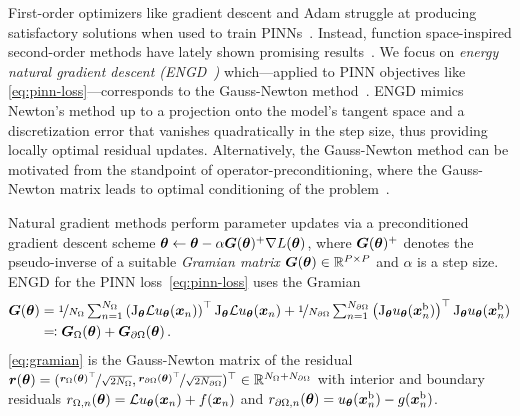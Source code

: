 First-order optimizers like gradient descent and Adam struggle at producing satisfactory solutions when used to train PINNs~\citep{cuomo2022scientific}.
Instead, function space-inspired second-order methods have lately shown promising results~\citep{muller2024optimization}.
We focus on \emph{energy natural gradient descent (ENGD~\cite{muller2023achieving})} which---applied to PINN objectives like \eqref{eq:pinn-loss}---corresponds to the Gauss-Newton method~\cite[][Chapter 6.3]{bottou2016machine}.
ENGD mimics Newton's method up to a projection onto the model's tangent space and a discretization error that vanishes quadratically in the step size, thus providing locally optimal residual updates.
Alternatively, the Gauss-Newton method can be motivated from the standpoint of operator-preconditioning, where the Gauss-Newton matrix leads to optimal conditioning of the problem~\citep{de2023operator}.

Natural gradient methods perform parameter updates via a preconditioned gradient descent scheme ${\bm{\theta}} \leftarrow {\bm{\theta}} - \alpha {\bm{G}}({\bm{\theta}})^+\nabla L({\bm{\theta}})$, where ${\bm{G}}({\bm{\theta}})^+$ denotes the pseudo-inverse of a suitable \emph{Gramian matrix} ${\bm{G}}({\bm{\theta}}) \in {\mathbb{R}}^{P \times P}$ and $\alpha$ is a step size.
ENGD for the PINN loss~\eqref{eq:pinn-loss} uses the Gramian
\begin{align}\label{eq:gramian}
  \begin{split}
    {\bm{G}}({\bm{\theta}})
    &=
      \nicefrac{1}{N_\Omega}
      \textstyle
      \sum_{n=1}^{N_\Omega}
      \left( \mathrm{J}_{{\bm{\theta}}} \mathcal{L} u_{\bm{\theta}}({\bm{x}}_n) \right)^\top
      \mathrm{J}_{{\bm{\theta}}} \mathcal{L} u_{\bm{\theta}}({\bm{x}}_n)
      +
      \nicefrac{1}{N_{\partial\Omega}}
      \textstyle
      \sum_{n=1}^{N_{\partial\Omega}}
      \left(\mathrm{J}_{{\bm{\theta}}} u_{\bm{\theta}}({\bm{x}}_n^\text{b})  \right)^\top
      \mathrm{J}_{{\bm{\theta}}} u_{\bm{\theta}} ({\bm{x}}_n^\text{b})
    \\
    &\eqqcolon {\bm{G}}_\Omega({\bm{\theta}}) + {\bm{G}}_{\partial\Omega}({\bm{\theta}})\,.
  \end{split}
\end{align}
\eqref{eq:gramian} is the Gauss-Newton matrix of the residual ${\bm{r}}({\bm{\theta}}) = (\nicefrac{{\bm{r}}_\Omega({\bm{\theta}})^{\top}}{\sqrt{2N_\Omega}}, \nicefrac{{\bm{r}}_{\partial\Omega}({\bm{\theta}})^{\top}}{\sqrt{2N_{\partial\Omega}}} )^\top \in {\mathbb{R}}^{N_{\Omega} + N_{\partial\Omega}}$ with interior and boundary residuals $r_{\Omega,n}({\bm{\theta}}) = \mathcal{L} u_{\bm{\theta}}({\bm{x}}_n) + f({\bm{x}}_n)$ and $r_{\partial\Omega,n}({\bm{\theta}}) = u_{\bm{\theta}}({\bm{x}}_n^\text{b}) - g({\bm{x}}_n^\text{b})$.

